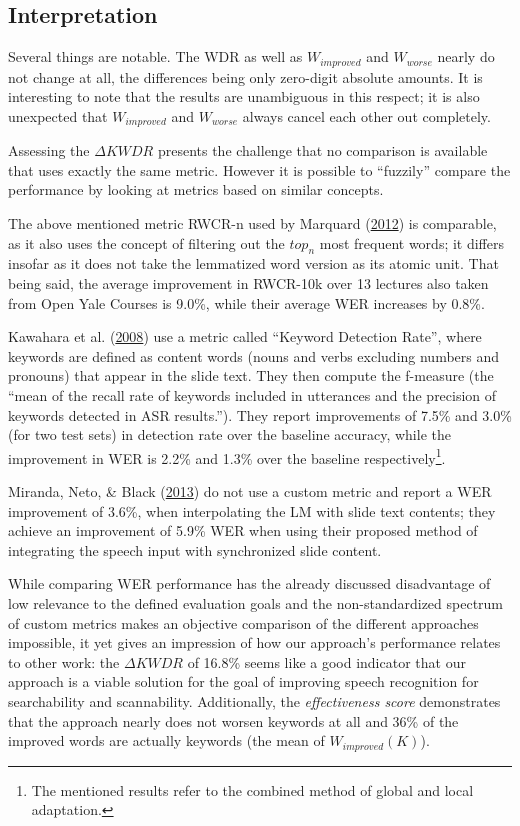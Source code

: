 \documentclass[]{article}
\begin{document}
\subsection{Interpretation}\label{interpretation}

Several things are notable. The WDR as well as \(W_{improved}\) and
\(W_{worse}\) nearly do not change at all, the differences being only
zero-digit absolute amounts. It is interesting to note that the results
are unambiguous in this respect; it is also unexpected that
\(W_{improved}\) and \(W_{worse}\) always cancel each other out
completely.

Assessing the \(\Delta KWDR\) presents the challenge that no comparison
is available that uses exactly the same metric. However it is possible
to ``fuzzily'' compare the performance by looking at metrics based on
similar concepts.

The above mentioned metric RWCR-n used by Marquard
(\hyperref[ref-marquard]{2012}) is comparable, as it also uses the
concept of filtering out the \(top_n\) most frequent words; it differs
insofar as it does not take the lemmatized word version as its atomic
unit. That being said, the average improvement in RWCR-10k over 13
lectures also taken from Open Yale Courses is 9.0\%, while their average
WER increases by 0.8\%.

Kawahara et al. (\hyperref[ref-kawahara08]{2008}) use a metric called
``Keyword Detection Rate'', where keywords are defined as content words
(nouns and verbs excluding numbers and pronouns) that appear in the
slide text. They then compute the f-measure (the ``mean of the recall
rate of keywords included in utterances and the precision of keywords
detected in ASR results.''). They report improvements of 7.5\% and 3.0\%
(for two test sets) in detection rate over the baseline accuracy, while
the improvement in WER is 2.2\% and 1.3\% over the baseline
respectively\footnote{The mentioned results refer to the combined method
  of global and local adaptation.}.

Miranda, Neto, \& Black (\hyperref[ref-miranda]{2013}) do not use a
custom metric and report a WER improvement of 3.6\%, when interpolating
the LM with slide text contents; they achieve an improvement of 5.9\%
WER when using their proposed method of integrating the speech input
with synchronized slide content.

While comparing WER performance has the already discussed disadvantage
of low relevance to the defined evaluation goals and the
non-standardized spectrum of custom metrics makes an objective
comparison of the different approaches impossible, it yet gives an
impression of how our approach's performance relates to other work: the
\(\Delta KWDR\) of 16.8\% seems like a good indicator that our approach
is a viable solution for the goal of improving speech recognition for
searchability and scannability. Additionally, the \emph{effectiveness
score} demonstrates that the approach nearly does not worsen keywords at
all and 36\% of the improved words are actually keywords (the mean of
\(W_{improved}(K)\)).
\end{document}
